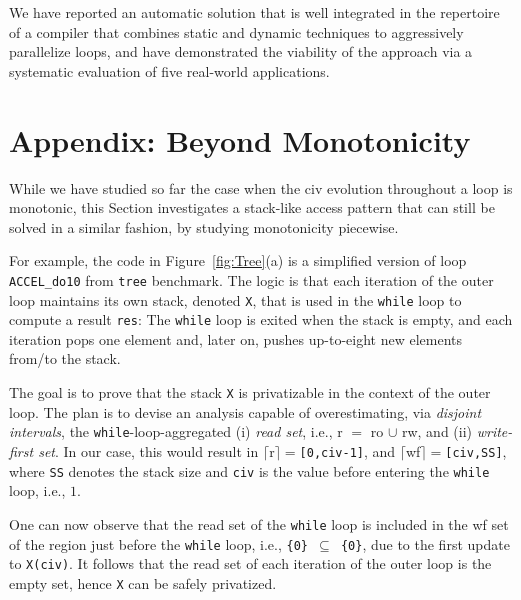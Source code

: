 \documentclass{sig-alternate}
\begin{document}
We have reported an automatic solution that is well integrated 
in the repertoire of a compiler that combines static and dynamic 
techniques to aggressively parallelize loops, and have 
demonstrated the viability of the approach via a systematic
evaluation of five real-world applications.

%

\begin{small}

\end{small}

\newpage

\section{Appendix: Beyond Monotonicity} %
\label{sec:Stack}

While we have studied so far the case when the {\sc civ} evolution
throughout a loop is monotonic, this Section investigates a stack-like 
access pattern that can still be solved in a similar fashion, by 
studying monotonicity piecewise.
 
For example, the code in Figure~\ref{fig:Tree}(a) is a simplified
version of loop {\tt ACCEL\_do10} from {\tt tree} benchmark. 
The logic is that each iteration of the outer loop maintains its own
stack, denoted {\tt X}, that is used in the {\tt while} loop to 
compute a result {\tt res}:
The {\tt while} loop is exited when the stack is empty, and each
iteration pops one element and, later on, pushes
up-to-eight new elements from/to the stack. 

The goal is to prove that the stack {\tt X} is privatizable in the
context of the outer loop.   The plan is to devise an analysis
capable of overestimating, via {\em disjoint intervals}, the   %
{\tt while}-loop-aggregated (i) {\em read set}, i.e., 
{\sc r} $=$ {\sc ro} $\cup$ {\sc rw}, and (ii) {\em write-first set}. 
In our case, this would result in  
$\lceil${\sc r}$\rceil=${\tt[0,civ-1]}, and
$\lceil${\sc wf}$\rceil=${\tt[civ,SS]}, where {\tt SS} denotes
the stack size and  {\tt civ} is the value before entering the 
{\tt while} loop, i.e., $1$.  

One can now observe that the read set of the {\tt while} loop 
is included in the {\sc wf} set of the region just before the 
{\tt while} loop, i.e., {\tt \{0\} $\subseteq$ \{0\}}, due to the 
first update to {\tt X(civ)}. It follows that the read set of
each iteration of the outer loop is the empty set, 
hence {\tt X} can be safely privatized. 
\end{document}
